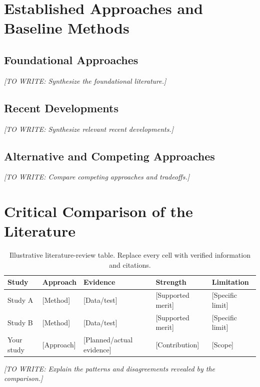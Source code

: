 \documentclass[12pt,a4paper,oneside]{report}
\newif\ifshowguidance
\newcommand{\Guide}[1]{%
  \ifshowguidance
  \begin{tcolorbox}[enhanced,breakable,colback=GuideBlue,
    colframe=GuideBorder,boxrule=0.5pt,arc=1mm,
    title={Writing guide --- replace with your research},
    colbacktitle=ThesisBlue,coltitle=white,fonttitle=\small\bfseries,
    before skip=10pt,after skip=10pt]
    \small #1
  \end{tcolorbox}
  \fi}
\newcommand{\Draft}[1]{\par\noindent\textit{[TO WRITE: #1]}\par}
\begin{document}
\section{Established Approaches and Baseline Methods}
\subsection{Foundational Approaches}
\Guide{Explain the central ideas, assumptions, evidence, and appropriate use
cases of established approaches. Discuss strengths as well as limitations.}
\Draft{Synthesize the foundational literature.}
\subsection{Recent Developments}
\Guide{Explain how later approaches address earlier limitations and what new
tradeoffs they introduce. Compare evaluation conditions before comparing
performance claims.}
\Draft{Synthesize relevant recent developments.}
\subsection{Alternative and Competing Approaches}
\Guide{Discuss credible alternatives, including simpler solutions. Explain
their relevance to your design and the rationale for your selected baselines.}
\Draft{Compare competing approaches and tradeoffs.}

\section{Critical Comparison of the Literature}
\Guide{Compare assumptions, data, evaluation settings, strengths, limitations,
and unresolved issues. A comparison table can help, but it needs an analytical
paragraph explaining the pattern. Do not copy authors' claims uncritically.}
\begin{table}[htbp]
\centering\small
\caption[Illustrative literature comparison]{Illustrative literature-review
table. Replace every cell with verified information and citations.}
\label{tab:literature}
\begin{tabularx}{\textwidth}{@{}p{}YYYY@{}}
\toprule Study & Approach & Evidence & Strength & Limitation\\\midrule
Study A & [Method] & [Data/test] & [Supported merit] & [Specific limit]\\
Study B & [Method] & [Data/test] & [Supported merit] & [Specific limit]\\
Your study & [Approach] & [Planned/actual evidence] & [Contribution] & [Scope]\\
\bottomrule
\end{tabularx}
\end{table}
\Draft{Explain the patterns and disagreements revealed by the comparison.}
\end{document}
